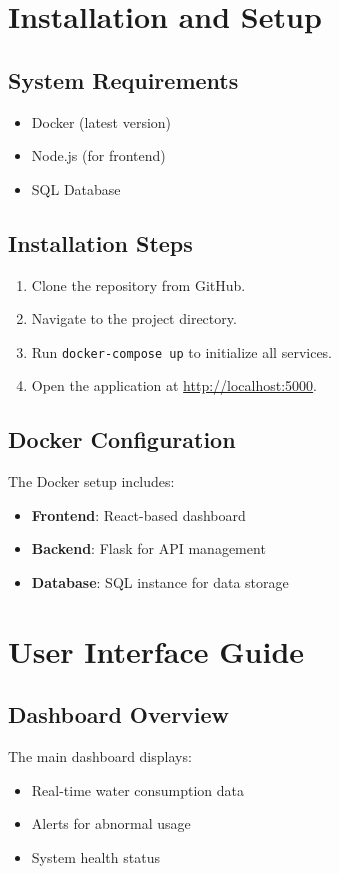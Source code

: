 \documentclass{article}
\begin{document}
\section{Installation and Setup}
\subsection{System Requirements}
\begin{itemize}
\item Docker (latest version)
\item Node.js (for frontend)
\item SQL Database
\end{itemize}

\subsection{Installation Steps}
\begin{enumerate}
\item Clone the repository from GitHub.
\item Navigate to the project directory.
\item Run \texttt{docker-compose up} to initialize all services.
\item Open the application at \url{http://localhost:5000}.
\end{enumerate}

\subsection{Docker Configuration}
The Docker setup includes:
\begin{itemize}
\item \textbf{Frontend}: React-based dashboard
\item \textbf{Backend}: Flask for API management
\item \textbf{Database}: SQL instance for data storage
\end{itemize}

\section{User Interface Guide}
\subsection{Dashboard Overview}
The main dashboard displays:
\begin{itemize}
\item Real-time water consumption data
\item Alerts for abnormal usage
\item System health status
\end{itemize}
\end{document}
